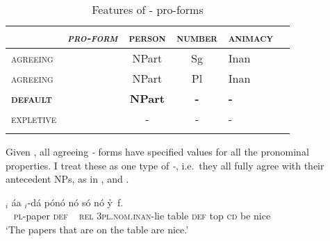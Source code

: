 \documentclass[output=paper]{LSP/langsci}
\begin{document}
\begin{table}[h]
 	\caption{Features of \textit{\eer}- pro-forms}
 	\label{tab:korsah:2}
 	\centering
 	\begin{tabular}{l>{\itshape}ccc p{2cm} c}
  \lsptoprule
 		
 		&\textup{\textsc{pro-form}}& \textsc{person} & \textsc{number}  & \textsc{animacy}   \\
 		\hline
 		\textsc{agreeing} &\eer & NPart & Sg & Inan  \\
 		\textsc{agreeing}&	\eer & NPart & Pl  & Inan \\
 		
 		\textbf{\textsc{default}}&	\textbf{\eer}&	\textbf{NPart} 	&	\textbf{-} & 	\textbf{-}  \\
 		
 		\textsc{expletive}& 	\eer& - 	&- & -   \\
 	 \lsptoprule
 		
 	\end{tabular}
 	
 \end{table}
 
 


  
Given , all agreeing \textit{\eer-} forms have specified values for all the pronominal properties. I treat these as one type of \textit{\eer-}, i.e.\ they all fully agree with their antecedent NPs, as in , and .
  
\ea\label{ex:korsah:23} 
\gll [ N-k{\'{r}}ata{\'{a}} n{\'{o}} ]$_i$  {\'{a}}a  \eer$_i$-d{\'{a}} p{\'{o}}n{\'{o}} n{\'{o}} s{\'{o}}  n{\'{o}} y\h \eer \, f\eer.\\
~ \textsc{pl-}paper  \textsc{def} ~ \textsc{rel} \textsc{3pl.nom.inan}-lie table \textsc{def} top \textsc{cd} be nice \\
\glt  `The papers that are on the table are nice.'

\z
\end{document}
